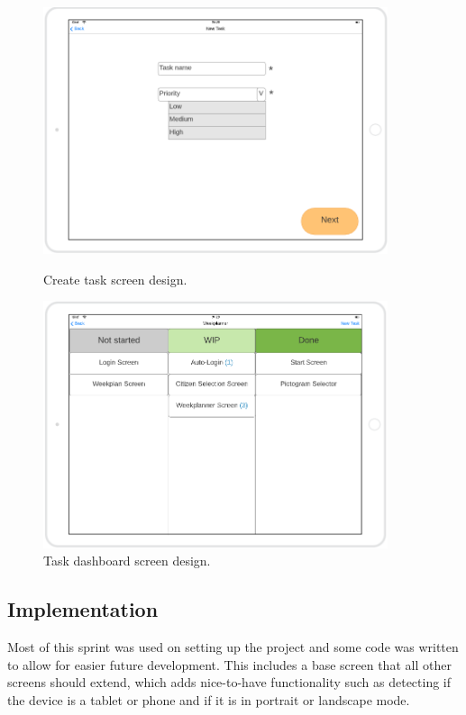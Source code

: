 \begin{figure}[H]
    \centering
    \begin{minipage}{0.45\textwidth}
        \centering
        \includegraphics[width=0.9\textwidth]{Sprint_1/images/create_task_screen.png}
        \caption{Create task screen design.}
        \label{create_task_screen}
    \end{minipage}\hfill
    \begin{minipage}{0.45\textwidth}
        \centering
        \includegraphics[width=0.9\textwidth]{Sprint_1/images/task_dashboard_screen.png}
        \caption{Task dashboard screen design.}
        \label{task_dashboard_screen}
    \end{minipage}
\end{figure}

\subsection{Implementation}
Most of this sprint was used on setting up the project and some code was written to allow for easier future development.
This includes a base screen that all other screens should extend, which adds nice-to-have functionality such as detecting if the device is a tablet or phone and if it is in portrait or landscape mode.

